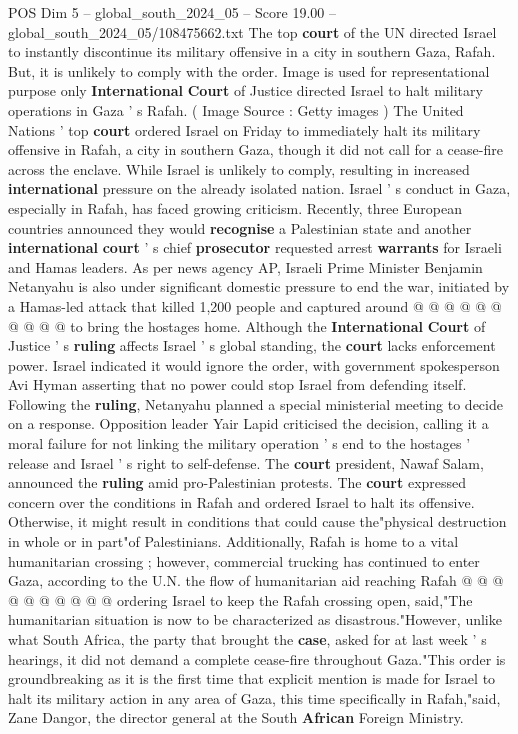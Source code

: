 \begin{textsample}{POS Dim 5 – global\_south\_2024\_05 – Score 19.00 – global\_south\_2024\_05/108475662.txt}  \label{ex:f5_pos_072}
The top \textbf{court} of the UN directed Israel to instantly discontinue its military offensive in a city in southern Gaza, Rafah.
But, it is unlikely to comply with the order.
Image is used for representational purpose only \textbf{International} \textbf{Court} of Justice directed Israel to halt military operations in Gaza ' s Rafah. ( Image Source : Getty images ) The United Nations ' top \textbf{court} ordered Israel on Friday to immediately halt its military offensive in Rafah, a city in southern Gaza, though it did not call for a cease-fire across the enclave.
While Israel is unlikely to comply, resulting in increased \textbf{international} pressure on the already isolated nation.
Israel ' s conduct in Gaza, especially in Rafah, has faced growing criticism.
Recently, three European countries announced they would \textbf{recognise} a Palestinian state and another \textbf{international} \textbf{court} ' s chief \textbf{prosecutor} requested arrest \textbf{warrants} for Israeli and Hamas leaders.
As per news agency AP, Israeli Prime Minister Benjamin Netanyahu is also under significant domestic pressure to end the war, initiated by a Hamas-led attack that killed 1,200 people and captured around @ @ @ @ @ @ @ @ @ @ to bring the hostages home.
Although the \textbf{International} \textbf{Court} of Justice ' s \textbf{ruling} affects Israel ' s global standing, the \textbf{court} lacks enforcement power.
Israel indicated it would ignore the order, with government spokesperson Avi Hyman asserting that no power could stop Israel from defending itself.
Following the \textbf{ruling}, Netanyahu planned a special ministerial meeting to decide on a response.
Opposition leader Yair Lapid criticised the decision, calling it a moral failure for not linking the military operation ' s end to the hostages ' release and Israel ' s right to self-defense.
The \textbf{court} president, Nawaf Salam, announced the \textbf{ruling} amid pro-Palestinian protests.
The \textbf{court} expressed concern over the conditions in Rafah and ordered Israel to halt its offensive.
Otherwise, it might result in conditions that could cause the"physical destruction in whole or in part"of Palestinians.
Additionally, Rafah is home to a vital humanitarian crossing ; however, commercial trucking has continued to enter Gaza, according to the U.N. the flow of humanitarian aid reaching Rafah @ @ @ @ @ @ @ @ @ @ ordering Israel to keep the Rafah crossing open, said,"The humanitarian situation is now to be characterized as disastrous."However, unlike what South Africa, the party that brought the \textbf{case}, asked for at last week ' s hearings, it did not demand a complete cease-fire throughout Gaza."This order is groundbreaking as it is the first time that explicit mention is made for Israel to halt its military action in any area of Gaza, this time specifically in Rafah,"said, Zane Dangor, the director general at the South \textbf{African} Foreign Ministry.

\end{textsample}
